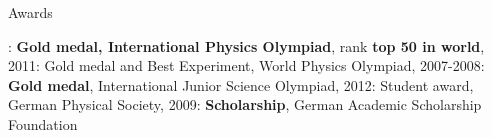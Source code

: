 \begin{rubric}{Awards}

\newcommand\textbox[1]{%
  \parbox{\textwidth}{#1}%
}
  \textbox{
: \textbf{Gold medal, International Physics Olympiad}, rank \textbf{top 50 in world}, 2011: Gold medal and Best Experiment, World Physics Olympiad, 2007-2008: \textbf{Gold medal}, International Junior Science Olympiad, 2012: Student award, German Physical Society, 2009: \textbf{Scholarship}, German Academic Scholarship Foundation}
\end{rubric}
